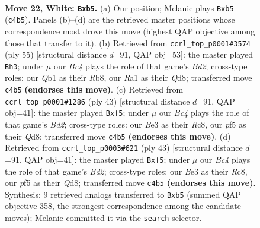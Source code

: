 \documentclass[11pt]{article}
\begin{document}
\clearpage

\begin{figure}[p]\centering
\begin{subfigure}{0.46\textwidth}\centering
\resizebox{\linewidth}{!}{%
\newchessgame
\chessboard[
  setfen={1nbq1kr1/4n3/4p3/rpP1Pp2/p1B2N2/P3B3/2P2KPp/RQ5R w - b6 0 22},
  showmover=false,
  pgfstyle=straightmove, color=movearrow, markmove={c4-b5}
]}
\caption{}
\end{subfigure}\hfill
\begin{subfigure}{0.46\textwidth}\centering
\resizebox{\linewidth}{!}{%
\newchessgame
\chessboard[
  setfen={1r1q1r1k/3b2b1/p1P4p/P2Bn1p1/Q4p2/6P1/1B3P1P/RR1N2K1 b - - 0 28},
  showmover=false,
  pgfstyle=straightmove, color=movearrow, markmove={d7-h3}
]}
\caption{}
\end{subfigure}
\\[4pt]
\begin{subfigure}{0.46\textwidth}\centering
\resizebox{\linewidth}{!}{%
\newchessgame
\chessboard[
  setfen={2rq1r1k/3b2pp/3p3b/pP2pP2/R1B4P/2N5/1P3PP1/3QK2R b K - 0 22},
  showmover=false,
  pgfstyle=straightmove, color=movearrow, markmove={d7-f5}
]}
\caption{}
\end{subfigure}\hfill
\begin{subfigure}{0.46\textwidth}\centering
\resizebox{\linewidth}{!}{%
\newchessgame
\chessboard[
  setfen={2rq1r1k/3b2pp/3p3b/pP2pP2/R1B4P/2N5/1P3PP1/3QK2R b K - 0 22},
  showmover=false,
  pgfstyle=straightmove, color=movearrow, markmove={d7-f5}
]}
\caption{}
\end{subfigure}
\caption{\textbf{Move 22, White: \texttt{Bxb5}.} (a) Our position; Melanie plays \texttt{Bxb5} (\texttt{c4b5}). Panels (b)--(d) are the retrieved master positions whose correspondence most drove this move (highest QAP objective among those that transfer to it). (b) Retrieved from \texttt{ccrl\_top\_p0001\#3574} (ply 55) [structural distance $d$=91, QAP obj=53]: the master played \texttt{Bh3}; under $\mu$ our \emph{Bc4} plays the role of that game's \emph{Bd2}; cross-type roles: our \emph{Q}b1 as their \emph{R}b8, our \emph{R}a1 as their \emph{Q}d8; transferred move \texttt{c4b5} \textbf{(endorses this move)}. (c) Retrieved from \texttt{ccrl\_top\_p0001\#1286} (ply 43) [structural distance $d$=91, QAP obj=41]: the master played \texttt{Bxf5}; under $\mu$ our \emph{Bc4} plays the role of that game's \emph{Bd2}; cross-type roles: our \emph{B}e3 as their \emph{R}c8, our \emph{p}f5 as their \emph{Q}d8; transferred move \texttt{c4b5} \textbf{(endorses this move)}. (d) Retrieved from \texttt{ccrl\_top\_p0003\#621} (ply 43) [structural distance $d$=91, QAP obj=41]: the master played \texttt{Bxf5}; under $\mu$ our \emph{Bc4} plays the role of that game's \emph{Bd2}; cross-type roles: our \emph{B}e3 as their \emph{R}c8, our \emph{p}f5 as their \emph{Q}d8; transferred move \texttt{c4b5} \textbf{(endorses this move)}. Synthesis: 9 retrieved analogs transferred to \texttt{Bxb5} (summed QAP objective 358, the strongest correspondence among the candidate moves); Melanie committed it via the \texttt{search} selector.}
\label{fig:thought-m42}
\end{figure}
\end{document}
